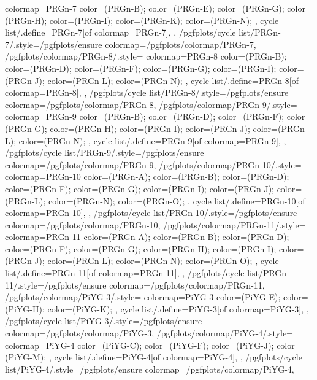 {{    colormap={PRGn-7}{
      color=(PRGn-B);
      color=(PRGn-E);
      color=(PRGn-G);
      color=(PRGn-H);
      color=(PRGn-I);
      color=(PRGn-K);
      color=(PRGn-N);
    },
    cycle list/.define={PRGn-7}{[of colormap=PRGn-7]},
  },
  /pgfplots/cycle list/PRGn-7/.style={/pgfplots/ensure colormap={/pgfplots/colormap/PRGn-7}},
  /pgfplots/colormap/PRGn-8/.style={
    colormap={PRGn-8}{
      color=(PRGn-B);
      color=(PRGn-D);
      color=(PRGn-F);
      color=(PRGn-G);
      color=(PRGn-I);
      color=(PRGn-J);
      color=(PRGn-L);
      color=(PRGn-N);
    },
    cycle list/.define={PRGn-8}{[of colormap=PRGn-8]},
  },
  /pgfplots/cycle list/PRGn-8/.style={/pgfplots/ensure colormap={/pgfplots/colormap/PRGn-8}},
  /pgfplots/colormap/PRGn-9/.style={
    colormap={PRGn-9}{
      color=(PRGn-B);
      color=(PRGn-D);
      color=(PRGn-F);
      color=(PRGn-G);
      color=(PRGn-H);
      color=(PRGn-I);
      color=(PRGn-J);
      color=(PRGn-L);
      color=(PRGn-N);
    },
    cycle list/.define={PRGn-9}{[of colormap=PRGn-9]},
  },
  /pgfplots/cycle list/PRGn-9/.style={/pgfplots/ensure colormap={/pgfplots/colormap/PRGn-9}},
  /pgfplots/colormap/PRGn-10/.style={
    colormap={PRGn-10}{
      color=(PRGn-A);
      color=(PRGn-B);
      color=(PRGn-D);
      color=(PRGn-F);
      color=(PRGn-G);
      color=(PRGn-I);
      color=(PRGn-J);
      color=(PRGn-L);
      color=(PRGn-N);
      color=(PRGn-O);
    },
    cycle list/.define={PRGn-10}{[of colormap=PRGn-10]},
  },
  /pgfplots/cycle list/PRGn-10/.style={/pgfplots/ensure colormap={/pgfplots/colormap/PRGn-10}},
  /pgfplots/colormap/PRGn-11/.style={
    colormap={PRGn-11}{
      color=(PRGn-A);
      color=(PRGn-B);
      color=(PRGn-D);
      color=(PRGn-F);
      color=(PRGn-G);
      color=(PRGn-H);
      color=(PRGn-I);
      color=(PRGn-J);
      color=(PRGn-L);
      color=(PRGn-N);
      color=(PRGn-O);
    },
    cycle list/.define={PRGn-11}{[of colormap=PRGn-11]},
  },
  /pgfplots/cycle list/PRGn-11/.style={/pgfplots/ensure colormap={/pgfplots/colormap/PRGn-11}},
  /pgfplots/colormap/PiYG-3/.style={
    colormap={PiYG-3}{
      color=(PiYG-E);
      color=(PiYG-H);
      color=(PiYG-K);
    },
    cycle list/.define={PiYG-3}{[of colormap=PiYG-3]},
  },
  /pgfplots/cycle list/PiYG-3/.style={/pgfplots/ensure colormap={/pgfplots/colormap/PiYG-3}},
  /pgfplots/colormap/PiYG-4/.style={
    colormap={PiYG-4}{
      color=(PiYG-C);
      color=(PiYG-F);
      color=(PiYG-J);
      color=(PiYG-M);
    },
    cycle list/.define={PiYG-4}{[of colormap=PiYG-4]},
  },
  /pgfplots/cycle list/PiYG-4/.style={/pgfplots/ensure colormap={/pgfplots/colormap/PiYG-4}},
}

